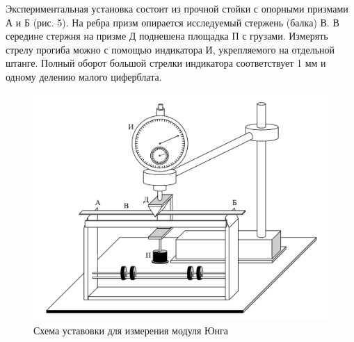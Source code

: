 \documentclass[a4paper,12 pt]{article}
\begin{document}
Экспериментальная установка состоит из прочной стойки с опорными призмами А и Б (рис. 5). На ребра призм опирается исследуемый стержень (балка) В. В середине стержня на призме Д поднешена площадка П с грузами. Измерять стрелу прогиба можно с помощью индикатора И, укрепляемого на отдельной штанге. Полный оборот большой стрелки индикатора соответствует 1 мм и одному делению малого циферблата.
\begin{figure}[H]
    \centering
    \includegraphics[scale = 0.4]{2.png}
    \caption{Схема уставовки для измерения модуля Юнга}
\end{figure}
\end{document}
